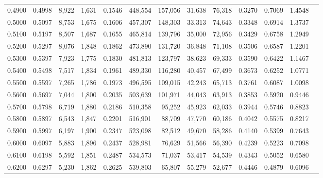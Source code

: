 \begin{tabular}{rrrrrrrrrrrrr}
0.4900 & 0.4998 &  8,922 & 1,631 &                                     0.1546 & 448,554 & 157,056 &  31,638 &  76,318 & 0.3270 & 0.7069 & 1.4548 \\
0.5000 & 0.5097 &  8,753 & 1,675 &                                     0.1606 & 457,307 & 148,303 &  33,313 &  74,643 & 0.3348 & 0.6914 & 1.3737 \\
0.5100 & 0.5197 &  8,507 & 1,687 &                                     0.1655 & 465,814 & 139,796 &  35,000 &  72,956 & 0.3429 & 0.6758 & 1.2949 \\
0.5200 & 0.5297 &  8,076 & 1,848 &                                     0.1862 & 473,890 & 131,720 &  36,848 &  71,108 & 0.3506 & 0.6587 & 1.2201 \\
0.5300 & 0.5397 &  7,923 & 1,775 &                                     0.1830 & 481,813 & 123,797 &  38,623 &  69,333 & 0.3590 & 0.6422 & 1.1467 \\
0.5400 & 0.5498 &  7,517 & 1,834 &                                     0.1961 & 489,330 & 116,280 &  40,457 &  67,499 & 0.3673 & 0.6252 & 1.0771 \\
0.5500 & 0.5597 &  7,265 & 1,786 &                                     0.1973 & 496,595 & 109,015 &  42,243 &  65,713 & 0.3761 & 0.6087 & 1.0098 \\
0.5600 & 0.5697 &  7,044 & 1,800 &                                     0.2035 & 503,639 & 101,971 &  44,043 &  63,913 & 0.3853 & 0.5920 & 0.9446 \\
0.5700 & 0.5798 &  6,719 & 1,880 &                                     0.2186 & 510,358 &  95,252 &  45,923 &  62,033 & 0.3944 & 0.5746 & 0.8823 \\
0.5800 & 0.5897 &  6,543 & 1,847 &                                     0.2201 & 516,901 &  88,709 &  47,770 &  60,186 & 0.4042 & 0.5575 & 0.8217 \\
0.5900 & 0.5997 &  6,197 & 1,900 &                                     0.2347 & 523,098 &  82,512 &  49,670 &  58,286 & 0.4140 & 0.5399 & 0.7643 \\
0.6000 & 0.6097 &  5,883 & 1,896 &                                     0.2437 & 528,981 &  76,629 &  51,566 &  56,390 & 0.4239 & 0.5223 & 0.7098 \\
0.6100 & 0.6198 &  5,592 & 1,851 &                                     0.2487 & 534,573 &  71,037 &  53,417 &  54,539 & 0.4343 & 0.5052 & 0.6580 \\
0.6200 & 0.6297 &  5,230 & 1,862 &                                     0.2625 & 539,803 &  65,807 &  55,279 &  52,677 & 0.4446 & 0.4879 & 0.6096 \\

\end{tabular}

